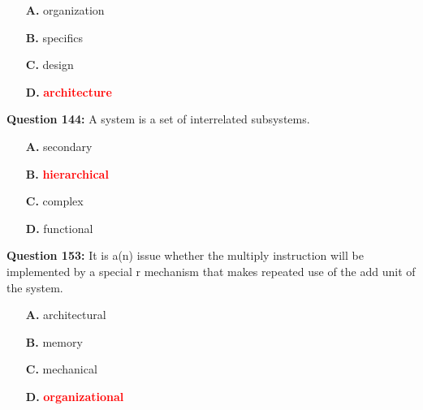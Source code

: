 \documentclass[12pt,a4paper]{article}
\begin{document}
\begin{itemize}
    \item[\textbf{A.}] organization
    \item[\textbf{B.}] specifics
    \item[\textbf{C.}] design
    \item[\textbf{D.}] \textcolor{red}{\textbf{architecture}}
\end{itemize}

\vspace{0.5cm}

\vspace{0.5cm}

\textbf{Question 144:} A \underline{\hspace{1.5cm}} system is a set of interrelated subsystems.

\begin{itemize}
    \item[\textbf{A.}] secondary
    \item[\textbf{B.}] \textcolor{red}{\textbf{hierarchical}}
    \item[\textbf{C.}] complex
    \item[\textbf{D.}] functional
\end{itemize}

\vspace{0.5cm}

\vspace{0.5cm}

\textbf{Question 153:} It is a(n) \underline{\hspace{1.5cm}} issue whether the multiply instruction will be implemented by a special r mechanism that makes repeated use of the add unit of the system.

\begin{itemize}
    \item[\textbf{A.}] architectural
    \item[\textbf{B.}] memory
    \item[\textbf{C.}] mechanical
    \item[\textbf{D.}] \textcolor{red}{\textbf{organizational}}
\end{itemize}

\vspace{0.5cm}

\vspace{0.5cm}

\vspace{0.5cm}

\vspace{0.5cm}
\end{document}
